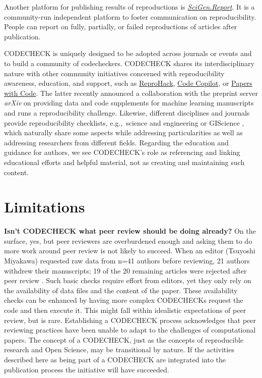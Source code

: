 \documentclass[12pt]{article}
\begin{document}
Another platform for publishing results of reproductions is
\href{https://scigen.report}{\emph{SciGen.Report}}.  It is a
community-run independent platform to foster communication on
reproducibility.  People can report on fully, partially, or
failed reproductions of articles after publication.

CODECHECK is uniquely designed to be adopted across journals or events
and to build a community of codecheckers. CODECHECK shares its
interdisciplinary nature with other community initiatives concerned
with reproducibility awareness, education, and support, such as
\href{https://reprohack.github.io/reprohack-hq/}{ReproHack},
\href{https://twitter.com/Code_Copilot}{Code Copilot}, or
\href{https://paperswithcode.com/about}{Papers with Code}.
The latter recently announced a collaboration with the preprint server
\emph{arXiv} on providing data and code supplements for machine
learning manuscripts
and runs a reproducibility challenge.
Likewise, different disciplines and journals provide reproducibility
checklists, e.g.,~science and engineering \cite{rosenberg_next_2020} or
GIScience \cite{nust_agile_2019}, which naturally share some aspects
while addressing particularities as well as addressing researchers
from different fields. Regarding the education and guidance for
authors, we see CODECHECK's role as referencing and linking
educational efforts and helpful material, not as creating and
maintaining such content.

\section*{Limitations}\label{limitations}

\textbf{Isn't CODECHECK what peer review should be doing already?}  On
the surface, yes, but peer reviewers are overburdened enough and
asking them to do more work around peer review is not likely to
succeed.  When an editor (Tsuyoshi Miyakawa) requested raw data from
n=41 authors before reviewing, 21 authors withdrew their manuscripts;
19 of the 20 remaining articles were rejected after peer review
\cite{miyakawa_no_2020}.  Such basic checks require effort from
editors, yet they only rely on the availability of data files and the
content of the paper.  These availability checks can be enhanced by
having more complex CODECHECKs request the code and then execute it.
This might fall within idealistic expectations of peer review, but is
rare.  Establishing a CODECHECK process acknowledges that peer
reviewing practices have been unable to adapt to the challenges of
computational papers.  The concept of a CODECHECK, just as the
concepts of reproducible research and Open Science, may be
transitional by nature. If the activities described here as being part
of a CODECHECK are integrated into the publication process the
initiative will have succeeded.
\end{document}
